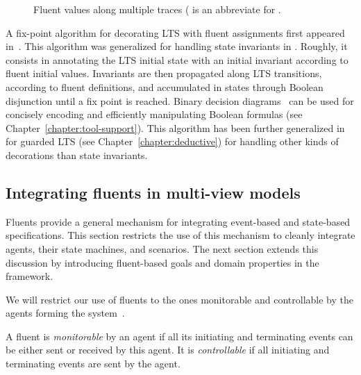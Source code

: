 \begin{figure}[H]\centering
{}
\caption{Fluent values along multiple traces ( is an abbreviate for .\label{image:fluent-values-along-multiple-traces}}
\end{figure}

A fix-point algorithm for decorating LTS with fluent assignments first appeared in~\cite{Damas:2005}. This algorithm was generalized for handling state invariants in \cite{Damas:2009, Damas:2011}. Roughly, it consists in annotating the LTS initial state with an initial invariant according to fluent initial values. Invariants are then propagated along LTS transitions, according to fluent definitions, and accumulated in states through Boolean disjunction until a fix point is reached. Binary decision diagrams~\cite{Bryant:1986} can be used for concisely encoding and efficiently manipulating Boolean formulas (see Chapter~\ref{chapter:tool-support}). This algorithm has been further generalized in~\cite{Damas:2011} for guarded LTS (see Chapter~\ref{chapter:deductive}) for handling other kinds of decorations than state invariants.

\subsection{Integrating fluents in multi-view models}

Fluents provide a general mechanism for integrating event-based and state-based specifications. This section restricts the use of this mechanism to cleanly integrate agents, their state machines, and scenarios. The next section extends this discussion by introducing fluent-based goals and domain properties in the framework.

We will restrict our use of fluents to the ones monitorable and controllable by the agents forming the system~\cite{Letier:2002}. 

A fluent is \emph{monitorable} by an agent if all its initiating and terminating events can be either sent or received by this agent. It is \emph{controllable} if all initiating and terminating events are sent by the agent. 

